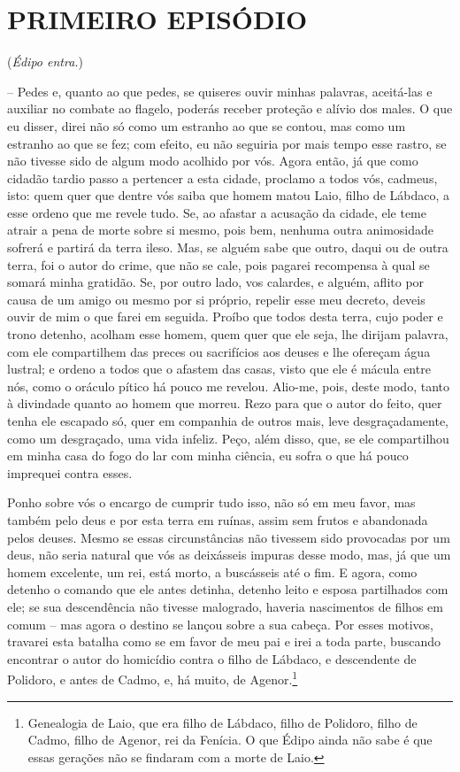 \section{PRIMEIRO EPISÓDIO}

(\emph{Édipo entra.})

 --   Pedes e, quanto ao que pedes, se quiseres ouvir minhas palavras,
aceitá-las e auxiliar no combate ao flagelo, poderás receber proteção e
alívio dos males. O que eu disser, direi não só como um estranho ao que
se contou, mas como um estranho ao que  se fez; com efeito, eu não
seguiria por mais tempo esse rastro, se não tivesse sido de algum modo
acolhido por vós. Agora então, já que como cidadão tardio passo a
pertencer a esta cidade, proclamo a todos vós, cadmeus, isto: quem quer
que dentre vós saiba que homem matou Laio, filho de Lábdaco, a esse
ordeno que me revele tudo. Se, ao afastar a acusação da cidade, ele teme
atrair a pena de morte sobre si mesmo, pois bem, nenhuma outra
animosidade sofrerá e partirá da terra ileso. Mas, se alguém sabe 
que outro, daqui ou de outra terra, foi o autor do crime, que não se
cale, pois pagarei recompensa à qual se somará minha gratidão. Se, por
outro lado, vos calardes, e alguém, aflito por causa de um amigo ou
mesmo por si próprio, repelir esse meu decreto, deveis ouvir de mim o
que farei em seguida. Proíbo que todos desta terra, cujo poder e trono
detenho, acolham esse homem, quem quer que ele seja, lhe dirijam
palavra, com ele compartilhem das preces ou sacrifícios aos deuses e lhe
ofereçam água  lustral; e ordeno a todos que o afastem das casas,
visto que ele é mácula entre nós, como o oráculo pítico há pouco me
revelou. Alio-me, pois, deste modo, tanto à divindade quanto ao homem
que morreu. Rezo para que o autor do feito, quer tenha ele escapado só,
quer em companhia de outros mais, leve desgraçadamente, como um
desgraçado, uma vida infeliz. Peço, além disso, que, se ele compartilhou
em minha casa  do fogo do lar com minha ciência, eu sofra o que há
pouco imprequei contra esses.

Ponho sobre vós o encargo de cumprir tudo isso, não só em meu favor, mas
também pelo deus e por esta terra em ruínas, assim sem frutos e
abandonada pelos deuses. Mesmo se essas circunstâncias não tivessem sido
provocadas por um deus, não seria natural que vós as deixásseis impuras
desse modo, mas, já que um homem excelente, um rei, está morto, a
buscásseis até o fim. E agora, como detenho o comando  que ele
antes detinha, detenho leito e esposa partilhados com ele; se sua
descendência não tivesse malogrado, haveria nascimentos de filhos em
comum -- mas agora o destino se lançou sobre a sua cabeça. Por esses
motivos, travarei esta batalha como se em favor de meu pai e irei a toda
parte, buscando encontrar o autor do homicídio contra o filho de
Lábdaco, e descendente de Polidoro, e antes de Cadmo, e, há muito, de
Agenor.\footnote{Genealogia de Laio, que era filho de Lábdaco, filho de
  Polidoro, filho de Cadmo, filho de Agenor, rei da Fenícia. O que Édipo
  ainda não sabe é que essas gerações não se findaram com a morte de
  Laio.}

